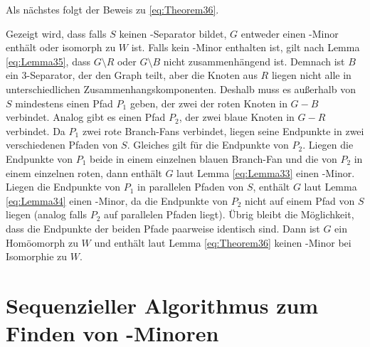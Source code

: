 Als nächstes folgt der Beweis zu \ref{eq:Theorem36}.
\begin{beweis}
  Gezeigt wird, dass falls $S$ keinen \dd-Separator bildet, $G$ entweder einen \kf-Minor enthält oder isomorph zu $W$ ist.
  Falls kein \kf-Minor enthalten ist, gilt nach Lemma \ref{eq:Lemma35}, dass $G \setminus R$ oder $G \setminus B$ nicht zusammenhängend ist.
  Demnach ist $B$ ein $3$-Separator, der den Graph teilt, aber die Knoten aus $R$ liegen nicht alle in unterschiedlichen Zusammenhangskomponenten.
  Deshalb muss es außerhalb von $S$ mindestens einen Pfad $P_1$ geben, der zwei der roten Knoten in $G - B$ verbindet.
  Analog gibt es einen Pfad $P_2$, der zwei blaue Knoten in $G - R$ verbindet.
  Da $P_1$ zwei rote Branch-Fans verbindet, liegen seine Endpunkte in zwei verschiedenen Pfaden von $S$.
  Gleiches gilt für die Endpunkte von $P_2$.
  Liegen die Endpunkte von $P_1$ beide in einem einzelnen blauen Branch-Fan und die von $P_2$ in einem einzelnen roten, dann enthält $G$ laut Lemma \ref{eq:Lemma33} einen \kf-Minor.
  Liegen die Endpunkte von $P_1$ in parallelen Pfaden von $S$, enthält $G$ laut Lemma \ref{eq:Lemma34} einen \kf-Minor, da die Endpunkte von $P_2$ nicht auf einem Pfad von $S$ liegen (analog falls $P_2$ auf parallelen Pfaden liegt).
  Übrig bleibt die Möglichkeit, dass die Endpunkte der beiden Pfade paarweise identisch sind.
  Dann ist $G$ ein Homöomorph zu $W$ und enthält laut Lemma \ref{eq:Theorem36} keinen \kf-Minor bei Isomorphie zu $W$.
\end{beweis}


\section{Sequenzieller Algorithmus zum Finden von \kf-Minoren}
\label{sec:sequenzieller_algorithmus_zum_finden_von_kf_minoren}

